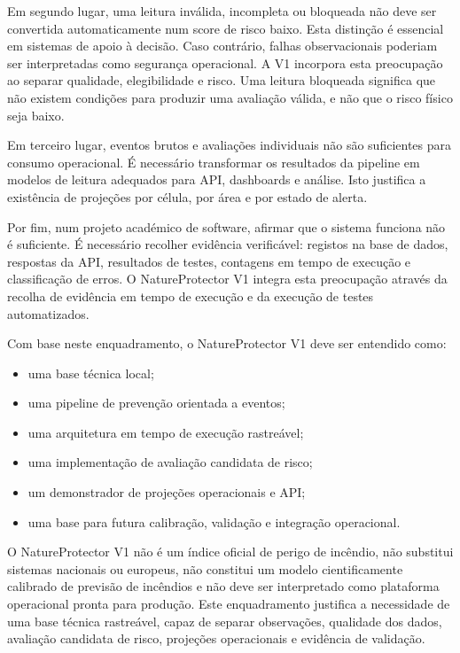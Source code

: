 Em segundo lugar, uma leitura inválida, incompleta ou bloqueada não deve ser convertida automaticamente num score de risco baixo. Esta distinção é essencial em sistemas de apoio à decisão. Caso contrário, falhas observacionais poderiam ser interpretadas como segurança operacional. A V1 incorpora esta preocupação ao separar qualidade, elegibilidade e risco. Uma leitura bloqueada significa que não existem condições para produzir uma avaliação válida, e não que o risco físico seja baixo.

Em terceiro lugar, eventos brutos e avaliações individuais não são suficientes para consumo operacional. É necessário transformar os resultados da pipeline em modelos de leitura adequados para API, dashboards e análise. Isto justifica a existência de projeções por célula, por área e por estado de alerta.

Por fim, num projeto académico de software, afirmar que o sistema funciona não é suficiente. É necessário recolher evidência verificável: registos na base de dados, respostas da API, resultados de testes, contagens em tempo de execução e classificação de erros. O NatureProtector V1 integra esta preocupação através da recolha de evidência em tempo de execução e da execução de testes automatizados.

Com base neste enquadramento, o NatureProtector V1 deve ser entendido como:

\begin{itemize}
    \item uma base técnica local;
    \item uma pipeline de prevenção orientada a eventos;
    \item uma arquitetura em tempo de execução rastreável;
    \item uma implementação de avaliação candidata de risco;
    \item um demonstrador de projeções operacionais e API;
    \item uma base para futura calibração, validação e integração operacional.
\end{itemize}

O NatureProtector V1 não é um índice oficial de perigo de incêndio, não substitui sistemas nacionais ou europeus, não constitui um modelo cientificamente calibrado de previsão de incêndios e não deve ser interpretado como plataforma operacional pronta para produção.
Este enquadramento justifica a necessidade de uma base técnica rastreável, capaz de separar observações, qualidade dos dados, avaliação candidata de risco, projeções operacionais e evidência de validação.